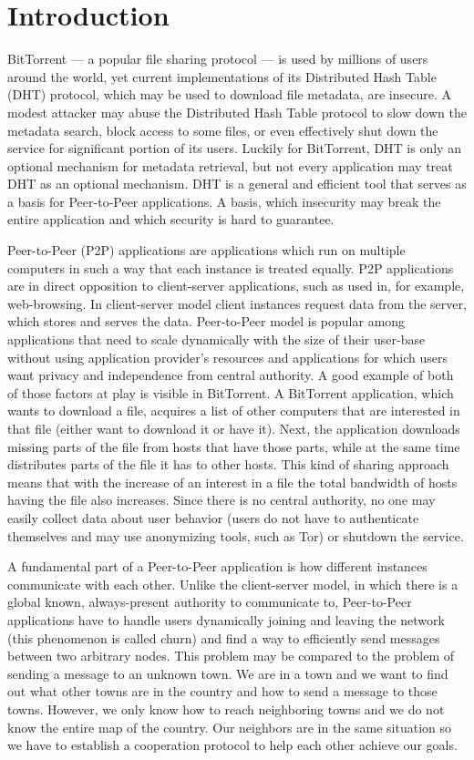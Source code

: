 \chapter{Introduction}

BitTorrent --- a popular file sharing protocol --- is used by millions of users
around the world, yet current implementations of its Distributed Hash Table
(DHT) protocol, which may be used to download file metadata, are insecure.
A modest attacker may abuse the Distributed Hash Table protocol to slow down the
metadata search, block access to some files, or even effectively shut down the
service for significant portion of its users.
Luckily for BitTorrent, DHT is only an optional mechanism for metadata
retrieval, but not every application may treat DHT as an optional mechanism.
DHT is a general and efficient tool that serves as a basis for Peer-to-Peer
applications.
A basis, which insecurity may break the entire application and which security is
hard to guarantee.

Peer-to-Peer (P2P) applications are applications which run on multiple computers
in such a way that each instance is treated equally.
P2P applications are in direct opposition to client-server applications, such as
used in, for example, web-browsing.
In client-server model client instances request data from the server, which
stores and serves the data.
Peer-to-Peer model is popular among applications that need to scale dynamically
with the size of their user-base without using application provider's resources
and applications for which users want privacy and independence from central
authority.
A good example of both of those factors at play is visible in BitTorrent.
A BitTorrent application, which wants to download a file, acquires a list of
other computers that are interested in that file (either want to download it or
have it).
Next, the application downloads missing parts of the file from hosts that have
those parts, while at the same time distributes parts of the file it has to
other hosts.
This kind of sharing approach means that with the increase of an interest in a
file the total bandwidth of hosts having the file also increases.
Since there is no central authority, no one may easily collect data about user
behavior (users do not have to authenticate themselves and may use anonymizing
tools, such as Tor) or shutdown the service.

A fundamental part of a Peer-to-Peer application is how different instances
communicate with each other.
Unlike the client-server model, in which there is a global known, always-present
authority to communicate to, Peer-to-Peer applications have to handle users
dynamically joining and leaving the network (this phenomenon is called churn)
and find a way to efficiently send messages between two arbitrary nodes.
This problem may be compared to the problem of sending a message to an unknown
town.
We are in a town and we want to find out what other towns are in the country and
how to send a message to those towns.
However, we only know how to reach neighboring towns and we do not know the
entire map of the country.
Our neighbors are in the same situation so we have to establish a cooperation
protocol to help each other achieve our goals.

